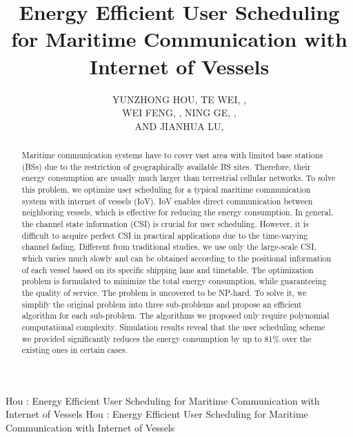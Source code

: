 \documentclass{ieeeaccess}
\begin{document}

\title{Energy Efficient User Scheduling for Maritime Communication with Internet of Vessels}
\author{\uppercase{Yunzhong Hou}, 
\uppercase{Te Wei}, ,\\
\uppercase{Wei Feng}, , 
\uppercase{Ning Ge}, ,
\\ \uppercase{and Jianhua Lu}, }

\address[1]{Tsinghua National Laboratory for Information Science and Technology, Tsinghua University, Beijing 100084, P. R. China}


\markboth
{Hou \headeretal: Energy Efficient User Scheduling for Maritime Communication with Internet of Vessels}
{Hou \headeretal: Energy Efficient User Scheduling for Maritime Communication with Internet of Vessels}


\begin{abstract}

Maritime communication systems have to cover vast area with limited base stations (BSs) due to the restriction of geographically available BS sites. Therefore, their energy consumption are usually much larger than terrestrial cellular networks. To solve this problem, we optimize user scheduling for a typical maritime communication system with internet of vessels (IoV). IoV enables direct communication between neighboring vessels, which is effective for reducing the energy consumption. 
In general, the channel state information (CSI) is crucial for user scheduling. However, it is difficult to acquire perfect CSI in practical applications due to the time-varying channel fading. Different from traditional studies, we use only the large-scale CSI, which varies much slowly and can be obtained according to the positional information of each vessel based on its specific shipping lane and timetable. 
The optimization problem is formulated to minimize the total energy consumption, while guaranteeing the quality of service. The problem is uncovered to be NP-hard. To solve it, we simplify the original problem into three sub-problems and propose an efficient algorithm for each sub-problem. The algorithms we proposed only require polynomial computational complexity. Simulation results reveal that the user scheduling scheme we provided significantly reduces the energy consumption by up to 81\% over the existing ones in certain cases.
\end{abstract}
\end{document}
